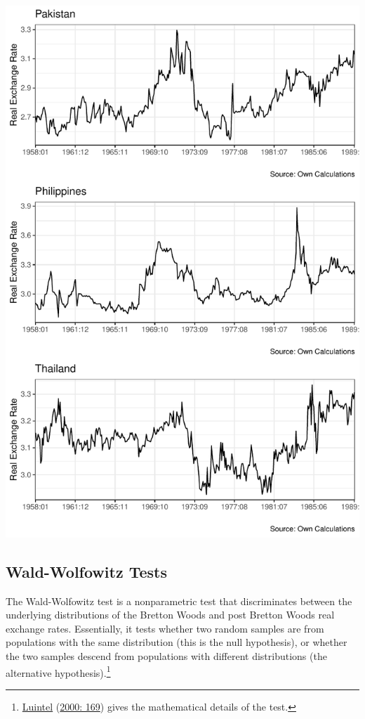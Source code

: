 \documentclass[11pt,preprint, authoryear]{elsarticle}
\let\origfigure\figure
\let\endorigfigure\endfigure
\renewenvironment{figure}[1][2] {
    \expandafter\origfigure\expandafter[H]
} {
    \endorigfigure
}
\numberwithin{equation}{section}
\numberwithin{figure}{section}
\numberwithin{table}{section}
\let\rmarkdownfootnote\footnote%
\def\footnote{\protect\rmarkdownfootnote}
\begin{document}
\begin{figure}[H]

{\centering \includegraphics{20346212_files/figure-latex/Figure2-1} 

}

\caption{Plot of Real Exchange Rates over Time\label{Figure1}}\label{fig:Figure2}
\end{figure}

\hypertarget{wald-wolfowitz-tests}{%
\subsection{\texorpdfstring{Wald-Wolfowitz Tests
\label{wald}}{Wald-Wolfowitz Tests }}\label{wald-wolfowitz-tests}}

The Wald-Wolfowitz test is a nonparametric test that discriminates
between the underlying distributions of the Bretton Woods and post
Bretton Woods real exchange rates. Essentially, it tests whether two
random samples are from populations with the same distribution (this is
the null hypothesis), or whether the two samples descend from
populations with different distributions (the alternative
hypothesis).\footnote{\protect\hyperlink{ref-Kul}{Luintel}
  (\protect\hyperlink{ref-Kul}{2000: 169}) gives the mathematical
  details of the test.}
\end{document}
